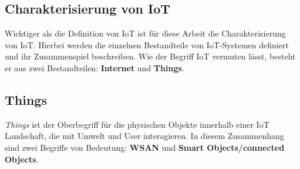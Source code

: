 \subsection{Charakterisierung von IoT}\label{subsec:characIot}
Wichtiger als die Definition von \ac{IoT} ist für diese Arbeit die Charakterisierung von \ac{IoT}. Hierbei werden die einzelnen Bestandteile von \ac{IoT}-Systemen definiert und ihr Zusammenspiel beschreiben. Wie der Begriff \acl{IoT} vermuten lässt, besteht er aus zwei Bestandteilen: \textbf{Internet} und \textbf{Things}.

\subsection{Things}
\textit{Things} ist der Oberbegriff für die physischen Objekte innerhalb einer \ac{IoT} Landschaft, die mit Umwelt und User interagieren. In diesem Zusammenhang sind zwei Begriffe von Bedeutung: \textbf{\ac{WSAN}} und \textbf{Smart Objects/connected Objects}.

